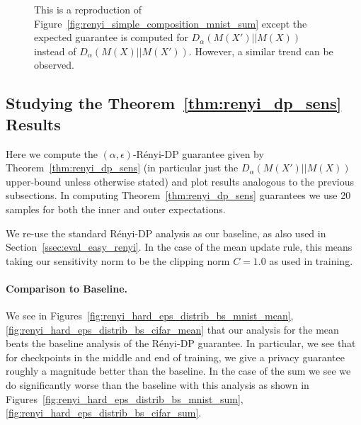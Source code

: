 \begin{figure}[t]
\centering
{}

\caption{This is a reproduction of Figure~\ref{fig:renyi_simple_composition_mnist_sum} except the expected guarantee is computed for $D_{\alpha}(M(X')||M(X))$ instead of $D_{\alpha}(M(X)||M(X'))$. However, a similar trend can be observed.
}
\label{fig:remove_10points}
\end{figure}



\subsection{Studying the Theorem~\ref{thm:renyi_dp_sens} Results}


Here we compute the $(\alpha,\epsilon)$-R\'enyi-DP guarantee given by Theorem~\ref{thm:renyi_dp_sens} (in particular just the $D_{\alpha}(M(X')||M(X))$ upper-bound unless otherwise stated) and plot results analogous to the previous subsections. In computing Theorem~\ref{thm:renyi_dp_sens} guarantees we use 20 samples for both the inner and outer expectations.



We re-use the standard R\'enyi-DP analysis as our baseline, as also used in Section~\ref{ssec:eval_easy_renyi}. In the case of the mean update rule, this means taking our sensitivity norm to be the clipping norm $C = 1.0$ as used in training. 







\paragraph{Comparison to Baseline.} We see in Figures~\ref{fig:renyi_hard_eps_distrib_bs_mnist_mean},\ref{fig:renyi_hard_eps_distrib_bs_cifar_mean} that our analysis for the mean beats the baseline analysis of the R\'enyi-DP guarantee. In particular, we see that for checkpoints in the middle and end of training, we give a privacy guarantee roughly a magnitude better than the baseline. In the case of the sum we see we do significantly worse than the baseline with this analysis as shown in Figures~\ref{fig:renyi_hard_eps_distrib_bs_mnist_sum},\ref{fig:renyi_hard_eps_distrib_bs_cifar_sum}.



